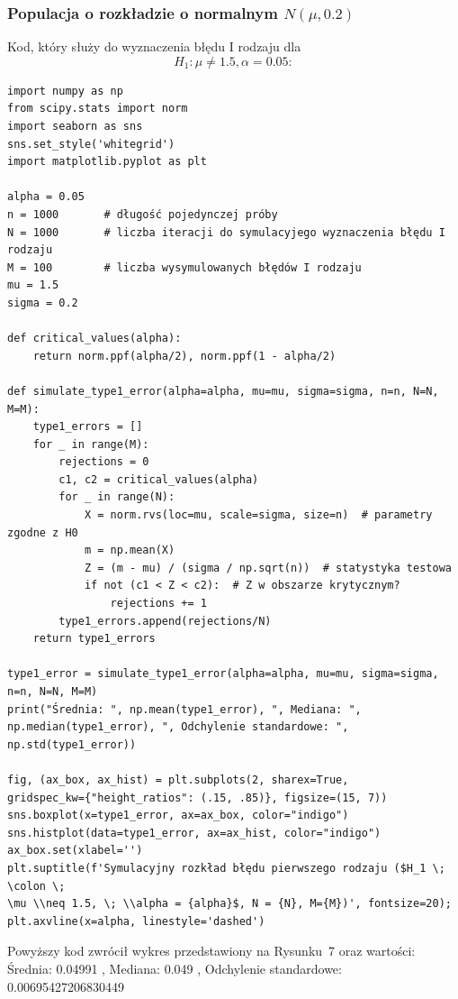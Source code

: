 \documentclass{article}
\begin{document}
\subsubsection{Populacja o rozkładzie o normalnym $N(\mu, 0.2)$}
Kod, który służy do wyznaczenia błędu I rodzaju dla $$H_1: \mu \neq 1.5, \alpha = 0.05:$$
\begin{verbatim}
import numpy as np
from scipy.stats import norm
import seaborn as sns
sns.set_style('whitegrid')
import matplotlib.pyplot as plt

alpha = 0.05
n = 1000       # długość pojedynczej próby
N = 1000       # liczba iteracji do symulacyjego wyznaczenia błędu I rodzaju
M = 100        # liczba wysymulowanych błędów I rodzaju 
mu = 1.5
sigma = 0.2

def critical_values(alpha):
    return norm.ppf(alpha/2), norm.ppf(1 - alpha/2)

def simulate_type1_error(alpha=alpha, mu=mu, sigma=sigma, n=n, N=N, M=M):
    type1_errors = []
    for _ in range(M):
        rejections = 0
        c1, c2 = critical_values(alpha)
        for _ in range(N):
            X = norm.rvs(loc=mu, scale=sigma, size=n)  # parametry zgodne z H0
            m = np.mean(X)
            Z = (m - mu) / (sigma / np.sqrt(n))  # statystyka testowa
            if not (c1 < Z < c2):  # Z w obszarze krytycznym?
                rejections += 1
        type1_errors.append(rejections/N)
    return type1_errors

type1_error = simulate_type1_error(alpha=alpha, mu=mu, sigma=sigma, n=n, N=N, M=M)
print("Średnia: ", np.mean(type1_error), ", Mediana: ",
np.median(type1_error), ", Odchylenie standardowe: ", np.std(type1_error))

fig, (ax_box, ax_hist) = plt.subplots(2, sharex=True, 
gridspec_kw={"height_ratios": (.15, .85)}, figsize=(15, 7))
sns.boxplot(x=type1_error, ax=ax_box, color="indigo")
sns.histplot(data=type1_error, ax=ax_hist, color="indigo")
ax_box.set(xlabel='')
plt.suptitle(f'Symulacyjny rozkład błędu pierwszego rodzaju ($H_1 \; \colon \; 
\mu \\neq 1.5, \; \\alpha = {alpha}$, N = {N}, M={M})', fontsize=20);
plt.axvline(x=alpha, linestyle='dashed')

\end{verbatim}
Powyższy kod zwrócił wykres przedstawiony na Rysunku~7 oraz wartości: \\
Średnia:  0.04991 , Mediana:  0.049 , Odchylenie standardowe:  0.00695427206830449
\end{document}
